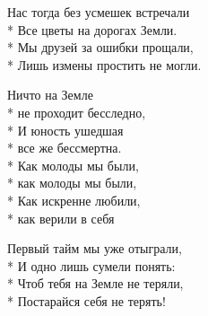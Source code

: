 \medskip

\begin{minipage}{\linewidth}
Нас тогда без усмешек встречали\\*
Все цветы на дорогах Земли.\\*
Мы друзей за ошибки прощали,\\*
Лишь измены простить не могли.\\
\end{minipage}\par\medskip\nobreak

\medskip

\begin{minipage}{\linewidth}
\hspace*{1.5em}Ничто на Земле\\*
\hspace*{1.5em}не проходит бесследно,\\*
\hspace*{1.5em}И юность ушедшая\\*
\hspace*{1.5em}все же бессмертна.\\*
\hspace*{1.5em}Как молоды мы были,\\*
\hspace*{1.5em}как молоды мы были,\\*
\hspace*{1.5em}Как искренне любили,\\*
\hspace*{1.5em}как верили в себя\\
\end{minipage}\par\medskip\nobreak

\medskip

\begin{minipage}{\linewidth}
Первый тайм мы уже отыграли,\\*
И одно лишь сумели понять:\\*
Чтоб тебя на Земле не теряли,\\*
Постарайся себя не терять!\\
\end{minipage}\par\medskip\nobreak

\medskip

